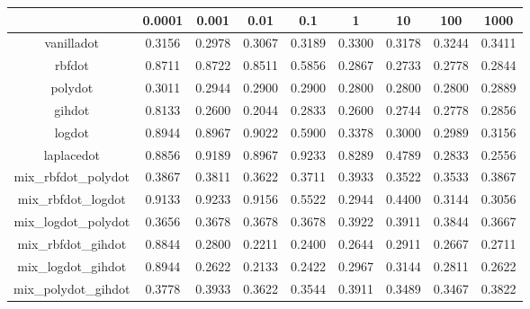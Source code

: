 \begin{table}[ht]
\centering
\begin{tabular}{ccccccccc}
  \hline
 & 0.0001 & 0.001 & 0.01 & 0.1 & 1 & 10 & 100 & 1000 \\ 
  \hline
vanilladot & 0.3156 & 0.2978 & 0.3067 & 0.3189 & 0.3300 & 0.3178 & 0.3244 & 0.3411 \\ 
  rbfdot & 0.8711 & 0.8722 & 0.8511 & 0.5856 & 0.2867 & 0.2733 & 0.2778 & 0.2844 \\ 
  polydot & 0.3011 & 0.2944 & 0.2900 & 0.2900 & 0.2800 & 0.2800 & 0.2800 & 0.2889 \\ 
  gihdot & 0.8133 & 0.2600 & 0.2044 & 0.2833 & 0.2600 & 0.2744 & 0.2778 & 0.2856 \\ 
  logdot & 0.8944 & 0.8967 & 0.9022 & 0.5900 & 0.3378 & 0.3000 & 0.2989 & 0.3156 \\ 
  laplacedot & 0.8856 & 0.9189 & 0.8967 & 0.9233 & 0.8289 & 0.4789 & 0.2833 & 0.2556 \\ 
  mix\_rbfdot\_polydot & 0.3867 & 0.3811 & 0.3622 & 0.3711 & 0.3933 & 0.3522 & 0.3533 & 0.3867 \\ 
  mix\_rbfdot\_logdot & 0.9133 & 0.9233 & 0.9156 & 0.5522 & 0.2944 & 0.4400 & 0.3144 & 0.3056 \\ 
  mix\_logdot\_polydot & 0.3656 & 0.3678 & 0.3678 & 0.3678 & 0.3922 & 0.3911 & 0.3844 & 0.3667 \\ 
  mix\_rbfdot\_gihdot & 0.8844 & 0.2800 & 0.2211 & 0.2400 & 0.2644 & 0.2911 & 0.2667 & 0.2711 \\ 
  mix\_logdot\_gihdot & 0.8944 & 0.2622 & 0.2133 & 0.2422 & 0.2967 & 0.3144 & 0.2811 & 0.2622 \\ 
  mix\_polydot\_gihdot & 0.3778 & 0.3933 & 0.3622 & 0.3544 & 0.3911 & 0.3489 & 0.3467 & 0.3822 \\ 
   \hline
\end{tabular}
\end{table}
